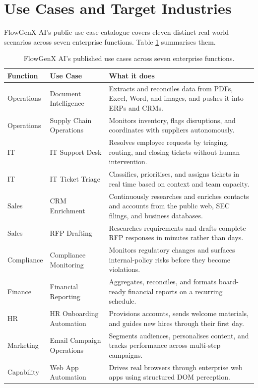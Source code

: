 \section{Use Cases and Target Industries}
FlowGenX AI's public use-case catalogue covers eleven distinct
real-world scenarios across seven enterprise functions. Table
\ref{tab:flowgenx-usecases} summarises them.

\begin{table}[H]
\centering
\renewcommand{\arraystretch}{1.25}
\begin{tabularx}{\textwidth}{l l X}
\toprule
\textbf{Function} & \textbf{Use Case} & \textbf{What it does} \\
\midrule
Operations & Document Intelligence    & Extracts and reconciles data from PDFs, Excel, Word, and images, and pushes it into ERPs and CRMs. \\
Operations & Supply Chain Operations  & Monitors inventory, flags disruptions, and coordinates with suppliers autonomously. \\
IT         & IT Support Desk          & Resolves employee requests by triaging, routing, and closing tickets without human intervention. \\
IT         & IT Ticket Triage         & Classifies, prioritises, and assigns tickets in real time based on context and team capacity. \\
Sales      & CRM Enrichment           & Continuously researches and enriches contacts and accounts from the public web, SEC filings, and business databases. \\
Sales      & RFP Drafting             & Researches requirements and drafts complete RFP responses in minutes rather than days. \\
Compliance & Compliance Monitoring    & Monitors regulatory changes and surfaces internal-policy risks before they become violations. \\
Finance    & Financial Reporting      & Aggregates, reconciles, and formats board-ready financial reports on a recurring schedule. \\
HR         & HR Onboarding Automation & Provisions accounts, sends welcome materials, and guides new hires through their first day. \\
Marketing  & Email Campaign Operations& Segments audiences, personalises content, and tracks performance across multi-step campaigns. \\
Capability & Web App Automation       & Drives real browsers through enterprise web apps using structured DOM perception. \\
\bottomrule
\end{tabularx}
\caption{FlowGenX AI's published use cases across seven enterprise functions.}
\label{tab:flowgenx-usecases}
\end{table}

